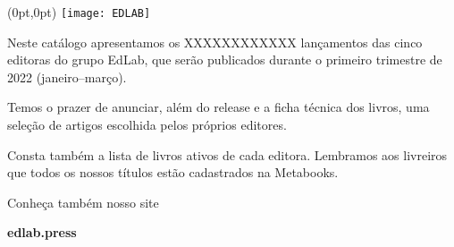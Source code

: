 
\begin{textblock*}{5.625in}(0pt,0pt)%
\vspace*{-3cm}
\hspace*{-2.1cm}\texttt{[image: EDLAB]}
\end{textblock*}

\pagebreak


\pagestyle{indice}

{}

\vspace{1.2cm}

{}


\hspace*{-7cm}\hrulefill\hspace*{-7cm}

\vspace{1cm}

\hspace*{-.5cm}\parbox{180pt}{\raggedright 
Neste catálogo apresentamos os XXXXXXXXXXXX
lançamentos das cinco editoras do grupo EdLab, que serão publicados durante o
primeiro trimestre de 2022 (janeiro--março). 

Temos o prazer de anunciar, além do release e a ficha técnica dos livros, uma 
seleção de artigos escolhida pelos próprios editores. 

Consta também a lista de 
livros ativos de cada editora. Lembramos aos livreiros que todos os nossos títulos
estão cadastrados na Metabooks.

Conheça também nosso site

{\Formular\textbf{edlab.press}}
} %

\pagebreak

